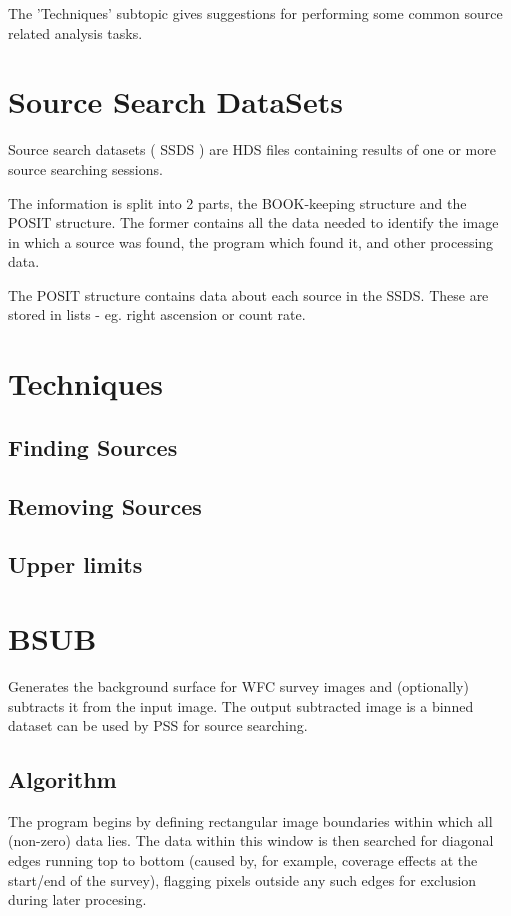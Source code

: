 \documentclass{book}
\renewcommand{\_}{{\tt\char'137}}     %
\begin{document}
The 'Techniques' subtopic gives suggestions for performing some
common source related analysis tasks.
 
\section{Source Search DataSets}
Source search datasets ( SSDS ) are HDS files containing results
of one or more source searching sessions.
 
The information is split into 2 parts, the BOOK-keeping structure
and the POSIT structure. The former contains all the data needed
to identify the image in which a source was found, the program
which found it, and other processing data.
 
The POSIT structure contains data about each source in the SSDS.
These are stored in lists - eg. right ascension or count rate.
 
\section{Techniques}
\subsection{Finding Sources}
\subsection{Removing Sources}
\subsection{Upper limits}
\section{BSUB}
Generates the background surface for WFC survey images and (optionally)
subtracts it from the input image. The output subtracted image is a
binned dataset can be used by PSS for source searching.
\subsection{Algorithm}
The program begins by defining rectangular image boundaries within which
all (non-zero) data lies. The data within this window is then searched
for diagonal edges running top to bottom (caused by, for example,
coverage effects at the start/end of the survey), flagging pixels outside
any such edges for exclusion during later procesing.
 
\end{document}
